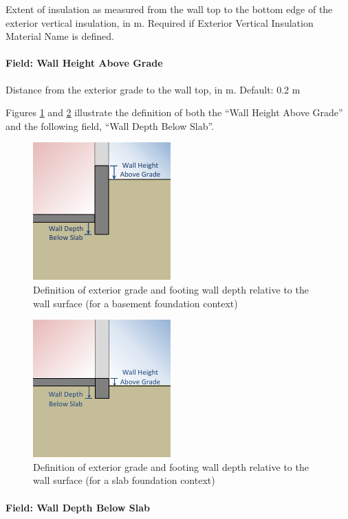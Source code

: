 Extent of insulation as measured from the wall top to the bottom edge of
the exterior vertical insulation, in m. Required if Exterior Vertical
Insulation Material Name is defined.

\paragraph{Field: Wall Height Above
Grade}

Distance from the exterior grade to the wall top, in m. Default: 0.2 m

Figures \ref{fig:2d-w} and \ref{fig:2d-w-slab} illustrate the definition of both the ``Wall
Height Above Grade'' and the following field, ``Wall Depth Below Slab''.

\begin{figure}
\centering
\includegraphics{media/kiva-2d-wall.png}
\caption{Definition of exterior grade and footing wall depth relative to
the wall surface (for a basement foundation context)\label{fig:2d-w}}
\end{figure}

\begin{figure}
\centering
\includegraphics{media/kiva-2d-wall-slab.png}
\caption{Definition of exterior grade and footing wall depth relative to
the wall surface (for a slab foundation context)\label{fig:2d-w-slab}}
\end{figure}

\paragraph{Field: Wall Depth Below
Slab}


